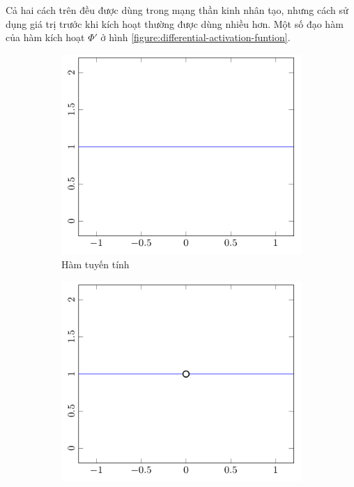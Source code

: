 Cả hai cách trên đều được dùng trong mạng thần kinh nhân tạo, nhưng cách sử dụng giá trị trước khi kích hoạt thường được dùng nhiều hơn. Một số đạo hàm của hàm kích hoạt $\Phi'$ ở hình \ref{figure:differential-activation-funtion}.
\begin{figure}[htbp]
    \centering
    \begin{subfigure}[b]{0.33\textwidth}
        \centering
        \includegraphics[width=\textwidth]{tikz_image/diff_identity.pdf}
        \caption{Hàm tuyến tính}
    \end{subfigure}\hfil%
    \begin{subfigure}[b]{0.33\textwidth}
        \centering
        \includegraphics[width=\textwidth]{tikz_image/diff_sign.pdf}

\end{subfigure}
\end{figure}
